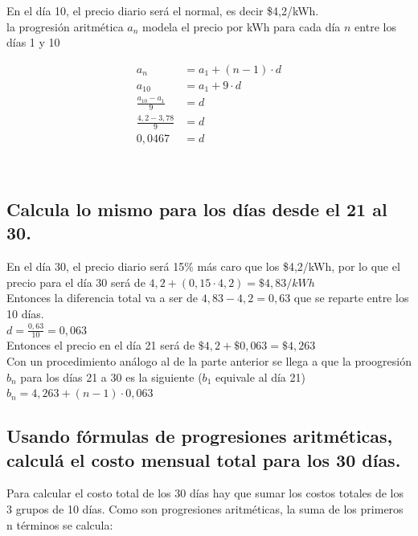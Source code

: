 \documentclass[11pt, a4paper]{article}
\begin{document}
En el día 10, el precio diario será el normal, es decir \$4,2/kWh. \\

la progresión aritmética $a_n$ modela el precio por kWh para cada día $n$ entre los días 1 y 10

\begin{align*}
a_n &= a_1 + (n-1) \cdot d \\
a_{10} &= a_1 + 9 \cdot d\\
\frac{a_{10}-a_1}{9} &= d\\
\frac{4,2-3,78}{9} &= d \\
\boxed{0,0467} &= d
\end{align*}

{ \\}

\subsection{Calcula lo mismo para los días desde el 21 al 30.}

En el día 30, el precio diario será 15\% más caro que los \$4,2/kWh, por lo que el precio para el día 30 será de $4,2+(0,15\cdot4,2)=\$4,83/kWh$ \\

Entonces la diferencia total va a ser de $4,83 - 4,2 = 0,63$ que se reparte entre los 10 días.\\

$d = \frac{0,63}{10} = 0,063$ \\

Entonces el precio en el día 21 será de $\$4,2 + \$0,063 = \$4,263$ \\

Con un procedimiento análogo al de la parte anterior se llega a que la proogresión $b_n$ para los días 21 a 30 es la siguiente ($b_1$ equivale al día 21) \\

$b_n = 4,263+(n-1) \cdot 0,063$ 

\subsection{Usando fórmulas de progresiones aritméticas, calculá el costo mensual total para los 30 días.}

Para calcular el costo total de los 30 días hay que sumar los costos totales de los 3 grupos de 10 días. Como son progresiones aritméticas, la suma de los primeros n términos se calcula: \\
\end{document}
